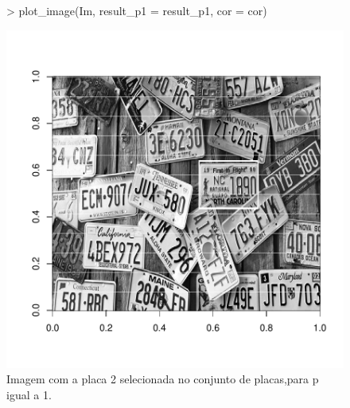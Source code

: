 \documentclass[12pt]{article}
\begin{document}
\begin{figure}
\centering
\begin{Schunk}
\begin{Sinput}
> plot_image(Im, result_p1 = result_p1, cor = cor)
\end{Sinput}
\end{Schunk}
\includegraphics{template_matching-019}
\caption{Imagem com a placa 2 selecionada no conjunto de placas,para p igual a 1.}
\label{placa1selecionada}
\end{figure}
\end{document}
